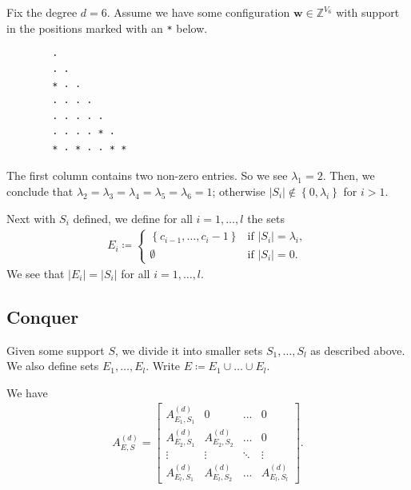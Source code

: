 \begin{example}\label{ex:decomposition-nsjkfnje}
    Fix the degree \( d=6 \). Assume we have some configuration \( \mathbf w \in \mathbb{Z}^{V_6} \) with support in the positions marked with an \texttt{*} below.
    \begin{verbatim}
        · 
        · · 
        * · · 
        · · · · 
        · · · · · 
        · · · · * · 
        * · * · · * *
    \end{verbatim}
    The first column contains two non-zero entries. So we see \( \lambda_1 = 2 \). Then, we conclude that \( \lambda_2 = \lambda_3 = \lambda_4 = \lambda_5 = \lambda_6 = 1\); otherwise \(     \lvert S_i \rvert \notin \left\{ 0, \lambda_i \right\}     \) for \( i>1 \).
\end{example}


Next with \( S_i \) defined, we define for all \( i=1, \dots, l \) the sets
\begin{align*}
    E_i \coloneqq \begin{cases}
        \left\{ c_{i-1}, \dots, c_i - 1 \right\} & \text{if } \lvert S_i \rvert = \lambda_i, \\
        \emptyset & \text{if } \lvert S_i \rvert = 0.
    \end{cases}
\end{align*}
We see that \( \lvert E_i \rvert = \lvert S_i \rvert \) for all \( i = 1, \dots, l \). 

\subsection*{Conquer}

Given some support \( S \), we divide it into smaller sets \( S_1, \dots, S_l \) as described above. We also define sets \( E_1, \dots, E_l \). Write \( E \coloneqq E_1 \cup \dots \cup E_l \).

\begin{proposition}
    We have 
    \begin{align*}
        A_{E,S}^{(d)} = 
        \begin{bmatrix}
            A_{E_1,S_1}^{(d)} & 0 & \dots & 0 \\
            A_{E_2,S_1}^{(d)} & A_{E_2,S_2}^{(d)} & \dots & 0 \\
            \vdots & \vdots & \ddots & \vdots \\
            A_{E_l,S_1}^{(d)} & A_{E_l,S_2}^{(d)} & \dots & A_{E_l,S_l}^{(d)}
        \end{bmatrix}.
    \end{align*}
\end{proposition}

